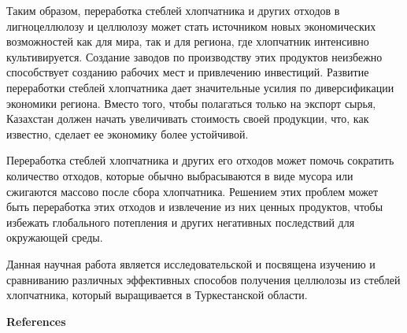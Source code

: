 Таким образом, переработка стеблей хлопчатника и других отходов в
лигноцеллюлозу и целлюлозу может стать источником новых экономических
возможностей как для мира, так и для региона, где хлопчатник интенсивно
культивируется. Создание заводов по производству этих продуктов
неизбежно способствует созданию рабочих мест и привлечению инвестиций.
Развитие переработки стеблей хлопчатника дает значительные усилия по
диверсификации экономики региона. Вместо того, чтобы полагаться только
на экспорт сырья, Казахстан должен начать увеличивать стоимость своей
продукции, что, как известно, сделает ее экономику более устойчивой.

Переработка стеблей хлопчатника и других его отходов может помочь
сократить количество отходов, которые обычно выбрасываются в виде мусора
или сжигаются массово после сбора хлопчатника. Решением этих проблем
может быть переработка этих отходов и извлечение из них ценных
продуктов, чтобы избежать глобального потепления и других негативных
последствий для окружающей среды.

Данная научная работа является исследовательской и посвящена изучению и
сравниванию различных эффективных способов получения целлюлозы из
стеблей хлопчатника, который выращивается в Туркестанской области.

{\bfseries References}

